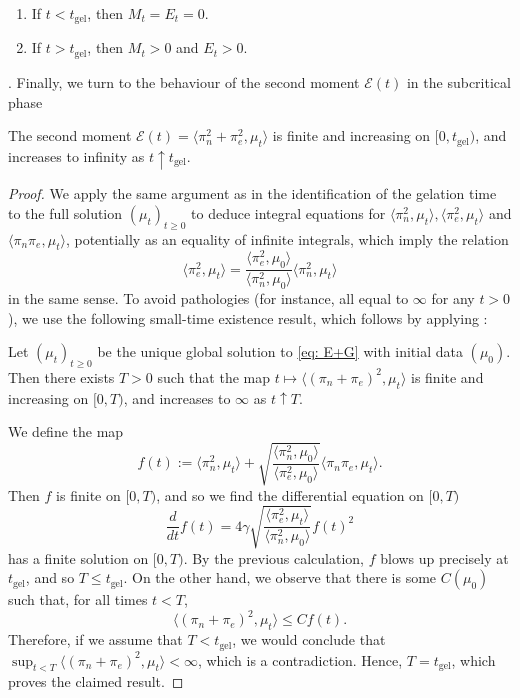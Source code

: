 \begin{lemma}
\begin{enumerate}[label=\roman{*}).]
        \item If $t<t_\text{gel}$, then $M_t=E_t=0$.
        \item If $t>t_\text{gel}$, then $M_t >0$ and $E_t>0$.
    \end{enumerate}
\end{lemma} . Finally, we turn to the behaviour of the second moment $\mathcal{E}(t)$ in the subcritical phase \begin{lemma} The second moment $\mathcal{E}(t)=\langle \pi_n^2+\pi_e^2, \mu_t\rangle$ is finite and increasing on $[0, t_\text{gel})$, and increases to infinity as $t\uparrow t_\text{gel}$. \end{lemma} \begin{proof} We apply the same argument as in the identification of the gelation time to the full solution $(\mu_t)_{t\geq 0}$ to deduce integral equations for $\langle \pi_n^2, \mu_t\rangle, \langle \pi_e^2, \mu_t\rangle$ and $\langle \pi_n\pi_e, \mu_t\rangle$, potentially as an equality of infinite integrals, which imply the relation \begin{equation}
    \langle \pi_e^2, \mu_t\rangle = \frac{\langle \pi_e^2, \mu_0\rangle}{\langle \pi_n^2, \mu_0\rangle}\langle \pi_n^2, \mu_t\rangle
\end{equation}in the same sense. To avoid pathologies (for instance, all equal to $\infty$ for any $t>0$), we use the following small-time existence result, which follows by applying \cite[Theorem 2.1]{N00}:\begin{lemma} Let $(\mu_t)_{t\geq 0}$ be the unique global solution to \ref{eq: E+G} with initial data $(\mu_0)$. Then there exists $T>0$ such that the map $t\mapsto\langle (\pi_n+\pi_e)^2, \mu_t\rangle$ is finite and increasing on $[0,T)$, and increases to $\infty$ as $t\uparrow T$. \end{lemma} We define the map \begin{equation}
    f(t) := \langle \pi_n^2, \mu_t\rangle
           + \sqrt{\frac{\langle \pi_n^2, \mu_0\rangle}
                        {\langle \pi_e^2, \mu_0\rangle}}
             \langle \pi_n \pi_e, \mu_t\rangle.
\end{equation} Then $f$ is finite on $[0, T)$, and so we find the differential equation on $[0,T)$ \begin{equation}
    \frac{d}{dt}f(t)=4\gamma\sqrt{\frac{\langle \pi_e^2, \mu_t\rangle}{\langle \pi_n^2, \mu_0\rangle}}f(t)^2
\end{equation} has a finite solution on $[0,T)$. By the previous calculation, $f$ blows up precisely at $t_\text{gel}$, and so $T\leq t_\text{gel}.$ On the other hand, we observe that there is some $C(\mu_0)$ such that, for all times $t<T$, \begin{equation}
    \langle (\pi_n+\pi_e)^2, \mu_t \rangle \leq Cf(t).
\end{equation} Therefore, if we assume that $T<t_\text{gel}$, we would conclude that $\sup_{t<T} \langle (\pi_n+\pi_e)^2, \mu_t\rangle <\infty$, which is a contradiction. Hence, $T=t_\text{gel}$, which proves the claimed result. \end{proof} 
